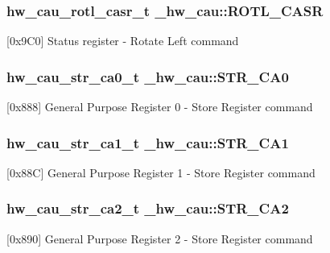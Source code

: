 \subsubsection[{\texorpdfstring{R\+O\+T\+L\+\_\+\+C\+A\+SR}{ROTL_CASR}}]{ {\bf hw\+\_\+cau\+\_\+rotl\+\_\+casr\+\_\+t} \+\_\+hw\+\_\+cau\+::\+R\+O\+T\+L\+\_\+\+C\+A\+SR}\hypertarget{struct__hw__cau_ae6c3793cf15e3fbad47686f699f555a9}{}\label{struct__hw__cau_ae6c3793cf15e3fbad47686f699f555a9}
\mbox{[}0x9\+C0\mbox{]} Status register -\/ Rotate Left command 
\subsubsection[{\texorpdfstring{S\+T\+R\+\_\+\+C\+A0}{STR_CA0}}]{ {\bf hw\+\_\+cau\+\_\+str\+\_\+ca0\+\_\+t} \+\_\+hw\+\_\+cau\+::\+S\+T\+R\+\_\+\+C\+A0}\hypertarget{struct__hw__cau_af2f63004d91c1bfdfa0803ca243ad647}{}\label{struct__hw__cau_af2f63004d91c1bfdfa0803ca243ad647}
\mbox{[}0x888\mbox{]} General Purpose Register 0 -\/ Store Register command 
\subsubsection[{\texorpdfstring{S\+T\+R\+\_\+\+C\+A1}{STR_CA1}}]{ {\bf hw\+\_\+cau\+\_\+str\+\_\+ca1\+\_\+t} \+\_\+hw\+\_\+cau\+::\+S\+T\+R\+\_\+\+C\+A1}\hypertarget{struct__hw__cau_ac96f8dd6b4f7728e2899d9cab8ccd094}{}\label{struct__hw__cau_ac96f8dd6b4f7728e2899d9cab8ccd094}
\mbox{[}0x88C\mbox{]} General Purpose Register 1 -\/ Store Register command 
\subsubsection[{\texorpdfstring{S\+T\+R\+\_\+\+C\+A2}{STR_CA2}}]{ {\bf hw\+\_\+cau\+\_\+str\+\_\+ca2\+\_\+t} \+\_\+hw\+\_\+cau\+::\+S\+T\+R\+\_\+\+C\+A2}\hypertarget{struct__hw__cau_adebbe904a615f2fa151430d58e25e5c9}{}\label{struct__hw__cau_adebbe904a615f2fa151430d58e25e5c9}
\mbox{[}0x890\mbox{]} General Purpose Register 2 -\/ Store Register command 
